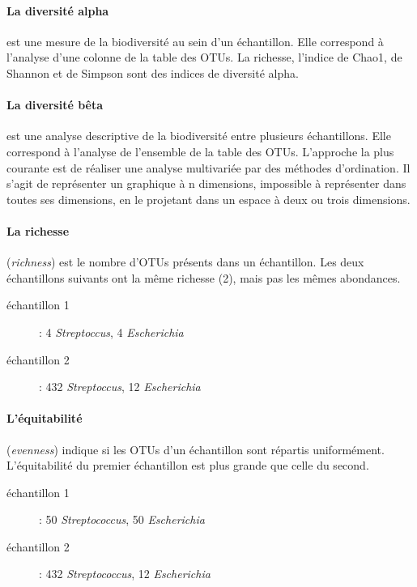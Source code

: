 \documentclass[12pt,a4paper]{article}
\begin{document}
\paragraph{La diversité alpha} est une mesure de la biodiversité au sein d’un échantillon. Elle correspond à l'analyse d'une colonne de la table des OTUs. La richesse, l'indice de Chao1, de Shannon et de Simpson sont des indices de diversité alpha.

\paragraph{La diversité bêta} est une analyse descriptive de la biodiversité entre plusieurs échantillons. Elle correspond à l'analyse de l’ensemble de la table des OTUs. L’approche la plus courante est de réaliser une analyse multivariée par des méthodes d’ordination. Il s’agit de représenter un graphique à n dimensions, impossible à représenter dans toutes ses dimensions, en le projetant dans un espace à deux ou trois dimensions.

\paragraph{La richesse}(\textit{richness}) est le nombre d'OTUs présents dans un échantillon. Les deux échantillons suivants ont la même richesse (2), mais pas les mêmes abondances.

\begin{description}
\item[échantillon 1] : 4 \textit{Streptoccus}, 4 \textit{Escherichia}
\item[échantillon 2] : 432 \textit{Streptoccus}, 12 \textit{Escherichia}
\end{description}

\paragraph{L'équitabilité}(\textit{evenness}) indique si les OTUs d’un échantillon sont répartis uniformément.
L'équitabilité du premier échantillon est plus grande que celle du second.

\begin{description}
\item[échantillon 1] : 50 \textit{Streptococcus}, 50 \textit{Escherichia}
\item[échantillon 2] : 432 \textit{Streptococcus}, 12 \textit{Escherichia}
\end{description}
\end{document}
